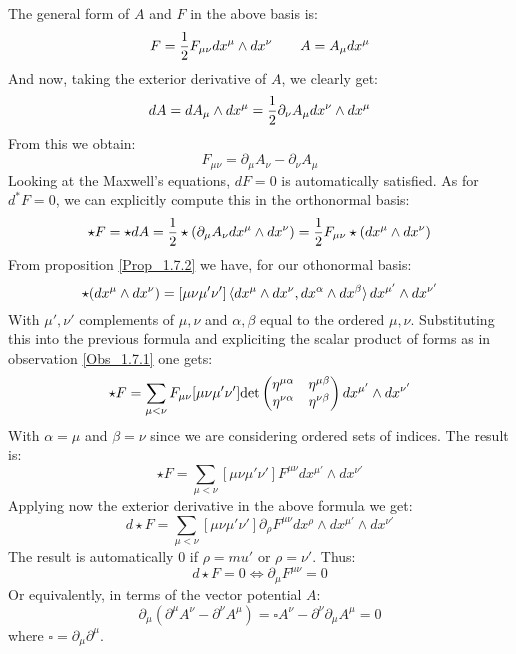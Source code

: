 \documentclass[12pt,a4paper]{report}
\theoremstyle{definition}
\theoremstyle{Theorem}
\theoremstyle{definition}
\theoremstyle{definition}
\begin{document}
	The general form of $A$ and $F$ in the above basis is:
	$$F={1\over 2}F_{\mu\nu}dx^\mu\wedge dx^\nu\hspace{20 pt} A=A_\mu dx^\mu$$
	And now, taking the exterior derivative of $A$, we clearly get:
	$$dA=dA_\mu\wedge dx^\mu={1\over 2}\partial_\nu A_\mu dx^\nu\wedge dx^\mu$$
	From this we obtain:
	$$F_{\mu\nu}=\partial_\mu A_\nu-\partial_\nu A_\mu$$
	Looking at the Maxwell's equations, $dF=0$ is automatically satisfied. As for $d^*F=0$, we can explicitly compute this in the orthonormal basis:
	$$\star F=\star dA={1\over 2}\star(\partial_\mu A_\nu dx^\mu\wedge dx^\nu)={1\over 2}F_{\mu\nu}\star(dx^\mu\wedge dx^\nu)$$
	From proposition \ref{Prop_1.7.2} we have, for our othonormal basis:
	$$\star (dx^\mu\wedge dx^\nu)= [\mu\nu\mu'\nu']\braket{dx^\mu\wedge dx^\nu,dx^\alpha\wedge dx^\beta}dx^{\mu'}\wedge dx^{\nu'}$$
	With $\mu',\nu'$ complements of $\mu,\nu$ and $\alpha,\beta$ equal to the ordered $\mu,\nu$. Substituting this into the previous formula and expliciting the scalar product of forms as in observation \ref{Obs_1.7.1} one gets:
	$$\star F=\sum_{\mu<\nu}F_{\mu\nu}[\mu\nu\mu'\nu']\hbox{det}
	\begin{pmatrix}
		\eta^{\mu\alpha} & \eta^{\mu\beta}\\
		\eta^{\nu\alpha} & \eta^{\nu\beta}\\
	\end{pmatrix} dx^{\mu'}\wedge dx^{\nu'}$$
	With $\alpha=\mu$ and $\beta=\nu$ since we are considering ordered sets of indices. The result is:
	$$\star F=\sum_{\mu<\nu}[\mu\nu\mu'\nu']F^{\mu\nu}dx^{\mu'}\wedge dx^{\nu'}$$
	Applying now the exterior derivative in the above formula we get:
	$$d\star F=\sum_{\mu<\nu}[\mu\nu\mu'\nu']\partial_\rho F^{\mu\nu}dx^\rho\wedge dx^{\mu'}\wedge dx^{\nu'}$$
	The result is automatically 0 if $\rho=mu'$ or $\rho=\nu'$. Thus:
	$$d\star F=0\iff \partial_\mu F^{\mu\nu}=0$$
	Or equivalently, in terms of the vector potential $A$:
	$$\partial_\mu(\partial^\mu A^\nu-\partial^\nu A^\mu)=\square A^\nu-\partial^\nu\partial_\mu A^\mu=0$$
	where $\square=\partial_\mu\partial^\mu$.
\end{document}
